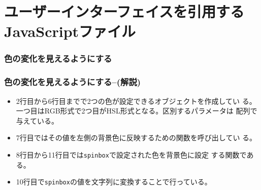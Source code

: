  \section{ユーザーインターフェイスを引用するJavaScriptファイル}
 \begin{frame}[containsverbatim]
  \frametitle{色の変化を見えるようにする}
 \end{frame}
 \begin{frame}[containsverbatim]
  \frametitle{色の変化を見えるようにする--(解説)}
 \begin{itemize}
	\item 2行目から6行目までで2つの色が設定できるオブジェクトを作成してい
				る。一つ目はRGB形式で2つ目がHSL形式となる。区別するパラメータは
				配列で与えている。
	\item 7行目ではその値を左側の背景色に反映するための関数を呼び出してい
				る。
	\item 8行目から11行目では\texttt{spinbox}で設定された色を背景色に設定
				する関数である。
	\item 10行目で\texttt{spinbox}の値を文字列に変換することで行っている。
 \end{itemize} \end{frame}

 \begin{frame}[containsverbatim]
  \frametitle{}
 \end{frame}
